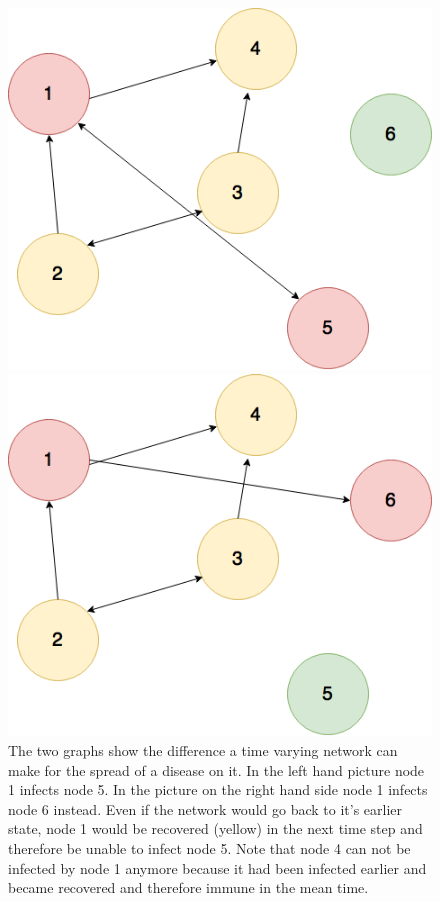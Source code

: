 \begin{figure}[htbp]
\begin{minipage}{0.5\textwidth}
\centering
\noindent\includegraphics[width=0.9\linewidth,height=\textheight,
keepaspectratio]{Graph4.png} 
\end{minipage}
\begin{minipage}{0.5\textwidth}
\centering
\noindent\includegraphics[width=0.9\linewidth,height=\textheight,
keepaspectratio]{Graph5.png} 
\end{minipage}
\caption[Disease Spread On A Time Dependant Network]{The two graphs show the difference a time varying network can make for the spread of a disease on it. In the left hand picture node 1 infects node 5. In the picture on the right hand side node 1 infects node 6 instead. Even if the network would go back to it's earlier state, node 1 would be recovered (yellow) in the next time step and therefore be unable to infect node 5. Note that node 4 can not be infected by node 1 anymore because it had been infected earlier and became recovered and therefore immune in the mean time.}
\label{fig:timeDependantNetworkSpread}
\end{figure}


